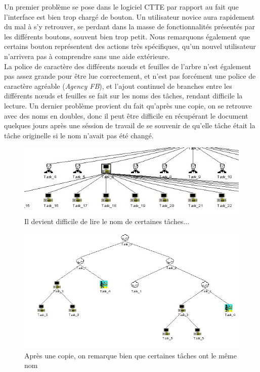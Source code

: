 \documentclass[12pt, a4paper]{article}
\begin{document}
Un premier problème se pose dans le logiciel CTTE par rapport au fait que l'interface est bien trop chargé de bouton. Un utilisateur novice aura rapidement du mal à s'y retrouver, se perdant dans la masse de fonctionnalités présentés par les différents boutons, souvent bien trop petit. Nous remarquons également que certains bouton représentent des actions très spécifiques, qu'un nouvel utilisateur n'arrivera pas à comprendre sans une aide extérieure.\\ 
La police de caractère des différents nœuds et feuilles de l'arbre n'est également pas assez grande pour être lue correctement, et n'est pas forcément une police de caractère agréable (\emph{Agency FB}), et l'ajout continuel de branches entre les différents nœuds et feuilles se fait sur les noms des tâches, rendant difficile la lecture. Un dernier problème provient du fait qu'après une copie, on se retrouve avec des noms en doubles, donc il peut être difficile en récupérant le document quelques jours après une séssion de travail de se souvenir de qu'elle tâche était la tâche originelle si le nom n'avait pas été changé. 
\begin{figure}[h]
\begin{center}
   \includegraphics[scale = 0.5]{empilement.jpg}
	\caption{Il devient difficile de lire le nom de certaines tâches...}
	\end{center}
\end{figure}

\begin{figure}[h]
\begin{center}
   \includegraphics[scale = 0.5]{copierate.jpg}
	\caption{Après une copie, on remarque bien que certaines tâches ont le même nom}
	\end{center}
\end{figure}
\newpage
\end{document}

